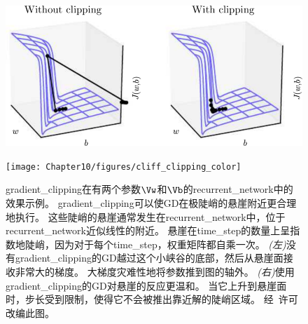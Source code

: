 \begin{figure}[!htb]
\ifOpenSource
\centerline{\includegraphics[scale=0.5]{images/105.png}}
\else
\centerline{\texttt{[image: Chapter10/figures/cliff\_clipping\_color]}}
\fi
\caption{\gls{gradient_clipping}在有两个参数$\Vw$和$\Vb$的\gls{recurrent_network}中的效果示例。
\gls{gradient_clipping}可以使\gls{GD}在极陡峭的悬崖附近更合理地执行。
这些陡峭的悬崖通常发生在\gls{recurrent_network}中，位于\gls{recurrent_network}近似线性的附近。
悬崖在\gls{time_step}的数量上呈指数地陡峭，因为对于每个\gls{time_step}，权重矩阵都自乘一次。
\emph{(左)}没有\gls{gradient_clipping}的\gls{GD}越过这个小峡谷的底部，然后从悬崖面接收非常大的梯度。
大梯度灾难性地将参数推到图的轴外。
\emph{(右)}使用\gls{gradient_clipping}的\gls{GD}对悬崖的反应更温和。
当它上升到悬崖面时，步长受到限制，使得它不会被推出靠近解的陡峭区域。
经~\citet{Pascanu-et-al-2013}许可改编此图。
}
\label{fig:chap10_cliff_clipping_color}
\end{figure}


